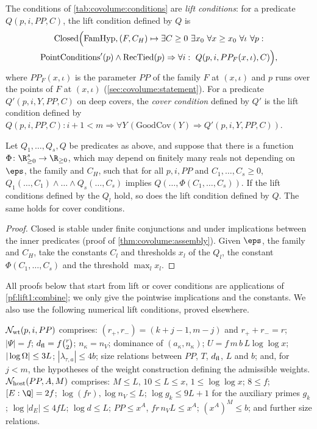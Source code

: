 The conditions of \cref{tab:covolume:conditions} are \emph{lift conditions}: for a predicate
$Q(p,i,PP,C)$, the lift condition defined by $Q$ is
\begin{multline*}
\mathrm{Closed}\Bigl(\mathrm{FamHyp},(F,C_H)\mapsto\exists C\ge0\ \exists x_0\ \forall x\ge x_0\
\forall\iota\ \forall p:\\
\mathrm{PointConditions}'(p)\wedge\mathrm{RecTied}(p)\Rightarrow\forall i:\
Q(p,i,PP_F(x,\iota),C)\Bigr),
\end{multline*}
where $PP_F(x,\iota)$ is the parameter $PP$ of the family $F$ at $(x,\iota)$ and $p$ runs over the points
of $F$ at $(x,\iota)$ (\cref{sec:covolume:statement}). For a predicate $Q'(p,i,Y,PP,C)$ on deep
covers, the \emph{cover condition} defined by $Q'$ is the lift condition defined by
$Q(p,i,PP,C)\colon i+1<m\Rightarrow\forall Y\,(\mathrm{GoodCov}(Y)\Rightarrow Q'(p,i,Y,PP,C))$.

\begin{lemma}[Combination]\label{pf:lift1:combine}
Let $Q_1,\dots,Q_s,Q$ be predicates as above, and suppose that there is a function
$\Phi\colon\R_{\ge0}^s\to\R_{\ge0}$, which may depend on finitely many reals not depending on $\eps$,
the family and $C_H$, such that for all $p,i,PP$ and $C_1,\dots,C_s\ge0$,
$Q_1(\dots,C_1)\wedge\dots\wedge Q_s(\dots,C_s)$ implies $Q(\dots,\Phi(C_1,\dots,C_s))$. If the lift
conditions defined by the $Q_l$ hold, so does the lift condition defined by $Q$. The same holds for cover
conditions.
\end{lemma}

\begin{proof}
$\mathrm{Closed}$ is stable under finite conjunctions and under implications between the inner
predicates (proof of \cref{thm:covolume:assembly}). Given $\eps$, the family and $C_H$, take the
constants $C_l$ and thresholds $x_l$ of the $Q_l$, the constant $\Phi(C_1,\dots,C_s)$ and the
threshold $\max_lx_l$.
\end{proof}

All proofs below that start from lift or cover conditions are applications of
\cref{pf:lift1:combine}; we only give the pointwise implications and the constants. We also use the
following numerical lift conditions, proved elsewhere.

\begin{definition}\label{pf:lift1:num}
$\mathcal N_{\mathrm{wt}}(p,i,PP)$ comprises: $(r_+,r_-)=(k+j-1,m-j)$ and $r_++r_-=r$; $|\Psi|=f$;
$d_{\mathrm{fl}}=f\binom r2$; $n_\kappa=n_V$; dominance of $(a_\kappa,n_\kappa)$;
$U=f\,m\,b\,L\log\log x$; $|\log\Omega|\le3L$; $|\lambda_{\tau,a}|\le4b$; size relations between
$PP$, $T$, $d_{\mathrm{fl}}$, $L$ and $b$; and, for $j<m$, the hypotheses of the weight construction
defining the admissible weights. $\mathcal N_{\mathrm{host}}(PP,A,M)$ comprises: $M\le L$, $10\le L\le x$,
$1\le\log\log x$; $8\le f$; $[E:\Q]=2f$; $\log(fr),\log n_V\le L$; $\log g_k\le9L+1$ for the auxiliary
primes $g_k$; $\log|d_E|\le4fL$; $\log d\le L$; $PP\le x^A$, $fr\,n_VL\le x^A$; $(x^A)^M\le b$; and
further size relations.
\end{definition}

